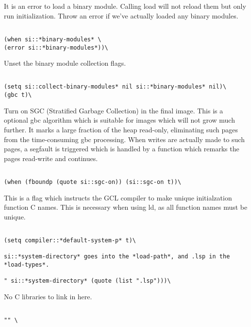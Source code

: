 \documentclass{article}
\begin{document}
It is an error to load a binary module. Calling load will not
reload them but only run initialization.
Throw an error if we've actually loaded any binary modules.
\begin{verbatim}

(when si::*binary-modules* \
(error si::*binary-modules*))\

\end{verbatim}

Unset the binary module collection flags.
\begin{verbatim}

(setq si::collect-binary-modules* nil si::*binary-modules* nil)\
(gbc t)\

\end{verbatim}

Turn on SGC (Stratified Garbage Collection) in the final image.  This
is a optional gbc algorithm which is suitable for images which will
not grow much further.  It marks a large fraction of the heap
read-only, eliminating such pages from the time-consuming gbc
processing.  When writes are actually made to such pages, a segfault
is triggered which is handled by a function which remarks the pages
read-write and continues.
\begin{verbatim}

(when (fboundp (quote si::sgc-on)) (si::sgc-on t))\

\end{verbatim}

This is a flag which instructs the GCL compiler to make unique
initialzation function C names.  This is necessary when using ld, as
all function names must be unique.
\begin{verbatim}

(setq compiler::*default-system-p* t)\

si::*system-directory* goes into the *load-path*, and .lsp in the *load-types*.

" si::*system-directory* (quote (list ".lsp")))\

\end{verbatim}
No C libraries to link in here.
\begin{verbatim}

"" \

\end{verbatim}
\end{document}
